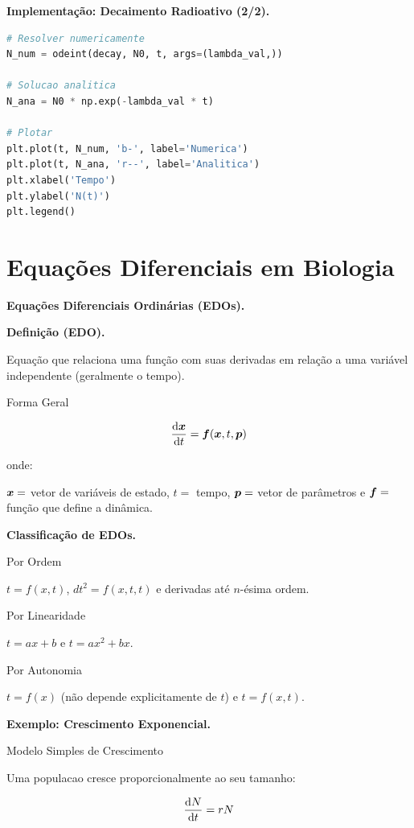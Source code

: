 \textbf{Implementação: Decaimento Radioativo (2/2).}

%
\begin{lstlisting}[language=Python, caption=Solução e Visualização]
# Resolver numericamente
N_num = odeint(decay, N0, t, args=(lambda_val,))

# Solucao analitica
N_ana = N0 * np.exp(-lambda_val * t)

# Plotar
plt.plot(t, N_num, 'b-', label='Numerica')
plt.plot(t, N_ana, 'r--', label='Analitica')
plt.xlabel('Tempo')
plt.ylabel('N(t)')
plt.legend()
\end{lstlisting}
%

\section{Equações Diferenciais em Biologia}

\textbf{Equações Diferenciais Ordinárias (EDOs).}

\textbf{Definição (EDO).}

Equação que relaciona uma função com suas derivadas em relação a uma variável independente (geralmente o tempo).

Forma Geral

%
\begin{equation*}
\frac{\mathrm{d} \boldsymbol{x}}{\mathrm{d} t} = \boldsymbol{f}(\boldsymbol{x}, t, \boldsymbol{p})
\end{equation*}
%

onde:

$\boldsymbol{x} = $ vetor de variáveis de estado, $t = $ tempo, $\boldsymbol{p} = $ vetor de parâmetros e $\boldsymbol{f} = $ função que define a dinâmica.

\textbf{Classificação de EDOs.}

Por Ordem

$t = f(x,t)$, $dt^2 = f(x, t, t)$ e derivadas até $n$-ésima ordem.

Por Linearidade

$t = ax + b$ e $t = ax^2 + bx$.

Por Autonomia

$t = f(x)$ (não depende explicitamente de $t$) e $t = f(x,t)$.

\textbf{Exemplo: Crescimento Exponencial.}

Modelo Simples de Crescimento

Uma populacao cresce proporcionalmente ao seu tamanho:

%
\begin{equation*}
\frac{\mathrm{d} N}{\mathrm{d} t} = rN
\end{equation*}
%

